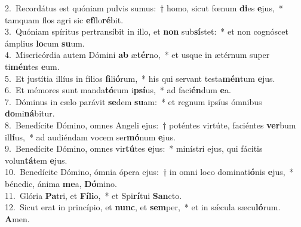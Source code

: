 {2.~}Recordátus est quóniam pulvis sumus:~† homo, sicut fœnum \textbf{di}es \textbf{e}jus,~* tamquam flos agri sic \textbf{ef}flo\textbf{ré}bit.\\
{3.~}Quóniam spíritus pertransíbit in illo, et \textbf{non} sub\textbf{sí}stet:~* et non cognóscet ámplius \textbf{lo}cum \textbf{su}um.\\
{4.~}Misericórdia autem Dómini \textbf{ab} æ\textbf{tér}no,~* et usque in ætérnum super ti\textbf{mén}tes \textbf{e}um.\\
{5.~}Et justítia illíus in fílios \textbf{fi}li\textbf{ó}rum,~* his qui servant testa\textbf{mén}tum \textbf{e}jus.\\
{6.~}Et mémores sunt manda\textbf{tó}rum i\textbf{psí}us,~* ad faci\textbf{én}dum \textbf{e}a.\\
{7.~}Dóminus in cælo parávit \textbf{se}dem \textbf{su}am:~* et regnum ipsíus ómnibus \textbf{do}mi\textbf{ná}bitur.\\
{8.~}Benedícite Dómino, omnes Angeli ejus:~† poténtes virtúte, faciéntes \textbf{ver}bum il\textbf{lí}us,~* ad audiéndam vocem ser\textbf{mó}num \textbf{e}jus.\\
{9.~}Benedícite Dómino, omnes vir\textbf{tú}tes \textbf{e}jus:~* minístri ejus, qui fácitis volun\textbf{tá}tem \textbf{e}jus.\\
{10.~}Benedícite Dómino, ómnia ópera ejus:~† in omni loco dominati\textbf{ó}nis \textbf{e}jus,~* bénedic, ánima \textbf{me}a, \textbf{Dó}mino.\\
{11.~}Glória \textbf{Pa}tri, et \textbf{Fí}\textbf{li}o,~* et Spi\textbf{rí}tui \textbf{San}cto.\\
{12.~}Sicut erat in princípio, et \textbf{nunc}, et \textbf{sem}per,~* et in sǽcula sæcu\textbf{ló}rum. \textbf{A}men.\\
